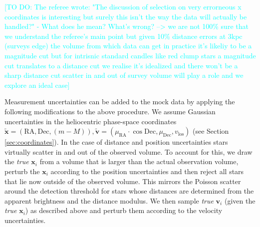 \documentclass[iop,revtex4,numberedappendix,appendixfloats]{emulateapj}
\newcommand{\vect}[1]{\boldsymbol{#1}}
\newcommand{\HW}[1]{\textcolor{Cyan}{#1}}
\begin{document}
\HW{[TO DO: The referee wrote: "The discussion of selection on very errorneous x coordinates is interesting but surely this isn't the way the data will actually be handled?" - What does he mean? What's wrong? --> we are not 100\% sure that we understand the referee's main point but
given 10\% distance errors at 3kpc (surveys edge) the volume from which
data can get
in practice it's likeliy to be a magnitude cut but for intrisnic standard
candles like red clump stars a magnitude cut translates to a distance cut
we realise it's idealized and there won't be a sharp distance cut
scatter in and out of survey volume will play a role and we explore an
ideal case]}

Measurement uncertainties can be added to the mock data by applying the following modifications to the above procedure. We assume Gaussian uncertainties in the heliocentric phase-space coordinates $\tilde{\vect{x}} = (\text{RA},\text{Dec},(m-M)), \tilde{\vect{v}} = (\mu_\text{RA} \cdot \cos \text{Dec} ,\mu_\text{Dec},v_\text{los})$ (see Section \ref{sec:coordinates}). In the case of distance and position uncertainties stars virtually scatter in and out of the observed volume. To account for this, we draw the \emph{true} $\vect{x}_i$ from a volume that is larger than the actual observation volume, perturb the $\vect{x}_i$ according to the position uncertainties and then reject all stars that lie now outside of the observed volume. This mirrors the Poisson scatter around the detection threshold for stars whose distances are determined from the apparent brightness and the distance modulus. We then sample \emph{true} $\vect{v}_i$ (given the \emph{true} $\vect{x}_i$) as described above and perturb them according to the velocity uncertainties.
\end{document}
